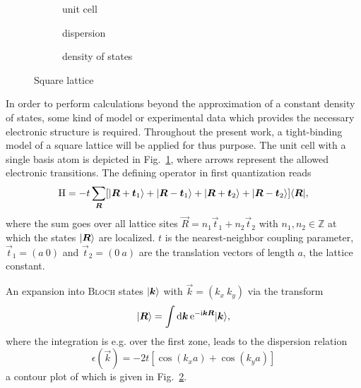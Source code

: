 \begin{figure}
    \small
    \begin{subfigure}[b]{4.666cm}
        \centering
        
        \caption{unit cell}
        \label{square-lattice unit cell}
    \end{subfigure}%
    \begin{subfigure}[b]{4.666cm}
        
        \caption{dispersion}
        \label{square-lattice dispersion}
    \end{subfigure}%
    \begin{subfigure}[b]{4.666cm}
        
        \caption{density of states}
        \label{square-lattice dos}
    \end{subfigure}
    \caption{Square lattice}
\end{figure}
%
In order to perform calculations beyond the approximation of a constant density
of states, some kind of model or experimental data which provides the necessary
electronic structure is required. Throughout the present work, a tight-binding
model of a square lattice will be applied for thus purpose. The unit cell with a
single basis atom is depicted in Fig.~\ref{square-lattice unit cell}, where
arrows represent the allowed electronic transitions. The defining
 operator in first quantization reads
%
\begin{equation*}
	\mathrm H = -t \sum_{\boldsymbol R}
         [ |\boldsymbol R + \boldsymbol t_1\rangle
         + |\boldsymbol R - \boldsymbol t_1\rangle
         + |\boldsymbol R + \boldsymbol t_2\rangle
         + |\boldsymbol R - \boldsymbol t_2\rangle ]
    \langle\boldsymbol R|,
\end{equation*}
%
where the sum goes over all lattice sites $\vec R = n_1 \vec t_1 + n_2 \vec t_2$
with $n_1, n_2 \in \mathds Z$ at which the  states $|\boldsymbol R\rangle$
are localized. $t$ is the nearest-neighbor coupling parameter, $\vec t_1 = (a \
0)$ and $\vec t_2 = (0 \ a)$ are the translation vectors of length $a$, the
lattice constant.

An expansion into \textsc{Bloch} states $|\boldsymbol k\rangle$ with $\vec k = (k_x \
k_y)$ via the  transform
%
\begin{equation*}
    |\boldsymbol R\rangle = \int \mathrm d \boldsymbol k \, \mathrm e^{-\mathrm i \boldsymbol k \boldsymbol R} |\boldsymbol k\rangle,
\end{equation*}
%
where the integration is e.g. over the first  zone, leads to the
dispersion relation
%
\begin{equation*}
	\epsilon(\vec k) = -2 t [\cos(k_x a) + \cos(k_y a)]
\end{equation*}
%
a contour plot of which is given in Fig.~\ref{square-lattice dispersion}.

